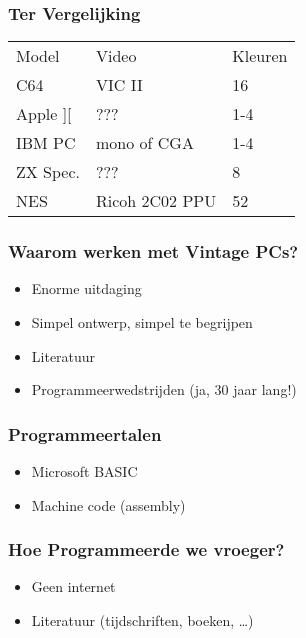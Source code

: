 \documentclass[aspectratio=43]{uva-inf-presentation}
\begin{document}

\begin{frame}
\frametitle{Ter Vergelijking}

\begin{tabular}{|l|l|l|}
\hline Model & Video & Kleuren \\
C64 & VIC II & 16 \\
Apple ][ & ??? & 1-4 \\
IBM PC & mono of CGA & 1-4 \\
ZX Spec. & ??? & 8 \\ \hline
NES & Ricoh 2C02 PPU & 52 \\ \hline
\end{tabular}

\end{frame}


\begin{frame}
\frametitle{Waarom werken met Vintage PCs?}

\begin{itemize}
\item Enorme uitdaging
\item Simpel ontwerp, simpel te begrijpen
\item Literatuur
\item Programmeerwedstrijden (ja, 30 jaar lang!)
\end{itemize}

\end{frame}


\begin{frame}
\frametitle{Programmeertalen}

\begin{itemize}
\item Microsoft BASIC
\item Machine code (assembly)
\end{itemize}

\end{frame}


\begin{frame}
\frametitle{Hoe Programmeerde we vroeger?}

\begin{itemize}
\item Geen internet
\item Literatuur (tijdschriften, boeken, \dots)
\end{itemize}

\end{frame}
\end{document}
